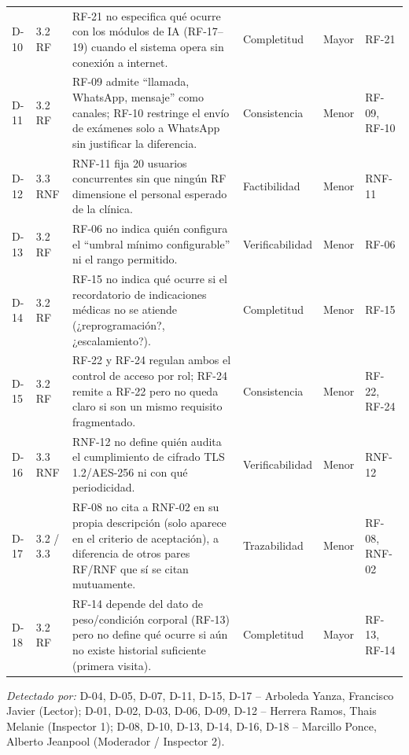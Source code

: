 \documentclass[11pt,a4paper]{article}
\newcommand{\subseccion}[1]{%
  \vspace{0.35cm}
  \noindent{\color{uteqverde}\textbf{\large #1}}\par
  \vspace{0.15cm}
}
\begin{document}
\begin{longtable}{p{1.1cm}p{1.6cm}p{4.6cm}p{1.7cm}p{1.7cm}p{2.6cm}}
D-10 & 3.2 RF & RF-21 no especifica qué ocurre con los módulos de IA (RF-17--19) cuando el sistema opera sin conexión a internet. & Completitud & Mayor & RF-21 \\
D-11 & 3.2 RF & RF-09 admite ``llamada, WhatsApp, mensaje'' como canales; RF-10 restringe el envío de exámenes solo a WhatsApp sin justificar la diferencia. & Consistencia & Menor & RF-09, RF-10 \\
D-12 & 3.3 RNF & RNF-11 fija 20 usuarios concurrentes sin que ningún RF dimensione el personal esperado de la clínica. & Factibilidad & Menor & RNF-11 \\
D-13 & 3.2 RF & RF-06 no indica quién configura el ``umbral mínimo configurable'' ni el rango permitido. & Verificabilidad & Menor & RF-06 \\
D-14 & 3.2 RF & RF-15 no indica qué ocurre si el recordatorio de indicaciones médicas no se atiende (¿reprogramación?, ¿escalamiento?). & Completitud & Menor & RF-15 \\
D-15 & 3.2 RF & RF-22 y RF-24 regulan ambos el control de acceso por rol; RF-24 remite a RF-22 pero no queda claro si son un mismo requisito fragmentado. & Consistencia & Menor & RF-22, RF-24 \\
D-16 & 3.3 RNF & RNF-12 no define quién audita el cumplimiento de cifrado TLS 1.2/AES-256 ni con qué periodicidad. & Verificabilidad & Menor & RNF-12 \\
D-17 & 3.2 / 3.3 & RF-08 no cita a RNF-02 en su propia descripción (solo aparece en el criterio de aceptación), a diferencia de otros pares RF/RNF que sí se citan mutuamente. & Trazabilidad & Menor & RF-08, RNF-02 \\
D-18 & 3.2 RF & RF-14 depende del dato de peso/condición corporal (RF-13) pero no define qué ocurre si aún no existe historial suficiente (primera visita). & Completitud & Mayor & RF-13, RF-14 \\
\bottomrule
\end{longtable}

\textit{Detectado por:} D-04, D-05, D-07, D-11, D-15, D-17 -- Arboleda Yanza,
Francisco Javier (Lector); D-01, D-02, D-03, D-06, D-09, D-12 -- Herrera Ramos,
Thais Melanie (Inspector 1); D-08, D-10, D-13, D-14, D-16, D-18 -- Marcillo
Ponce, Alberto Jeanpool (Moderador / Inspector 2).

\subseccion{4.5 Métricas de inspección}
\end{document}

